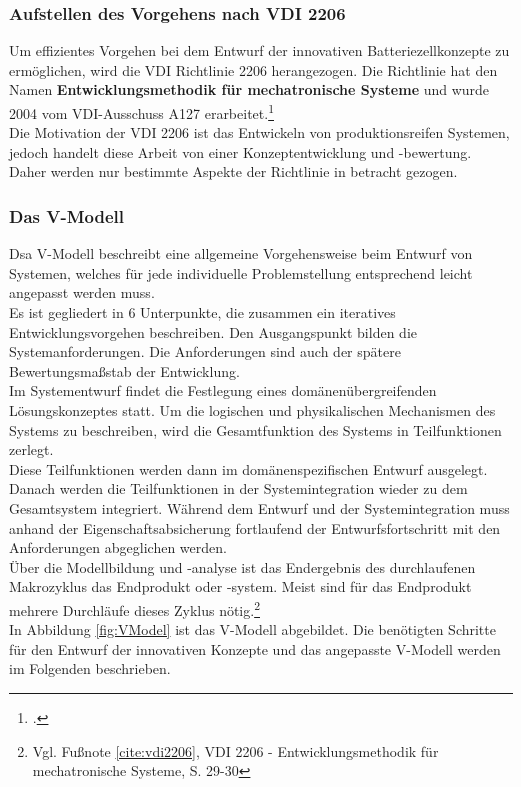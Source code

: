 \subsubsection{Aufstellen des Vorgehens nach VDI 2206}\label{subsub:vorgehennachVDI}

Um effizientes Vorgehen bei dem Entwurf der innovativen Batteriezellkonzepte zu ermöglichen, wird die VDI Richtlinie 2206 herangezogen. Die Richtlinie hat den Namen \textbf{Entwicklungsmethodik für mechatronische Systeme} und wurde 2004 vom VDI-Ausschuss A127 erarbeitet.\footcite[Vgl.\label{cite:vdi2206}][S. 3]{VDI2206.June2004}\\
Die Motivation der VDI 2206 ist das Entwickeln von produktionsreifen Systemen, jedoch handelt diese Arbeit von einer Konzeptentwicklung und -bewertung. Daher werden nur bestimmte Aspekte der Richtlinie in betracht gezogen.\\

\subsubsection*{Das V-Modell}

Dsa V-Modell beschreibt eine allgemeine Vorgehensweise beim Entwurf von Systemen, welches für jede individuelle Problemstellung entsprechend leicht angepasst werden muss.\\
Es ist gegliedert in 6 Unterpunkte, die zusammen ein iteratives Entwicklungsvorgehen beschreiben. Den Ausgangspunkt bilden die Systemanforderungen. Die Anforderungen sind auch der spätere Bewertungsmaßstab der Entwicklung.\\
Im Systementwurf findet die Festlegung eines domänenübergreifenden Lösungskonzeptes statt. Um die logischen und physikalischen Mechanismen des Systems zu beschreiben, wird die Gesamtfunktion des Systems in Teilfunktionen zerlegt.\\
Diese Teilfunktionen werden dann im domänenspezifischen Entwurf ausgelegt. Danach werden die Teilfunktionen in der Systemintegration wieder zu dem Gesamtsystem integriert. Während dem Entwurf und der Systemintegration muss anhand der Eigenschaftsabsicherung fortlaufend der Entwurfsfortschritt mit den Anforderungen abgeglichen werden.\\
Über die Modellbildung und -analyse ist das Endergebnis des durchlaufenen Makrozyklus das Endprodukt oder -system. Meist sind für das Endprodukt mehrere Durchläufe dieses Zyklus nötig.\footnote{Vgl. Fußnote \ref{cite:vdi2206}, VDI 2206 - Entwicklungsmethodik für mechatronische Systeme, S. 29-30}\\
In Abbildung \ref{fig:VModel} ist das V-Modell abgebildet. Die benötigten Schritte für den Entwurf der innovativen Konzepte und das angepasste V-Modell werden im Folgenden beschrieben.

